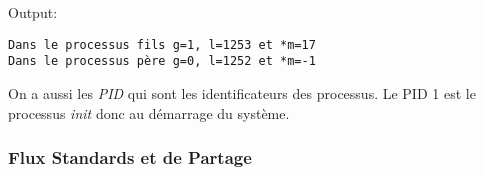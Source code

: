 \begin{Shaded}
\begin{Highlighting}[]
     \OperatorTok{(}\OperatorTok{=={-}}\OperatorTok{)} \OperatorTok{\{}
\OperatorTok{(}\OperatorTok{);} 
\OperatorTok{(}\OperatorTok{);}
    \OperatorTok{\}}
     \OperatorTok{(}\OperatorTok{==}\OperatorTok{)} \OperatorTok{\{}
\OperatorTok{++;}\OperatorTok{++;} \OperatorTok{*}\OperatorTok{=}\OperatorTok{;} 
\OperatorTok{(}\OperatorTok{,}\OperatorTok{,}\OperatorTok{,*}\OperatorTok{);} 
\OperatorTok{(}\OperatorTok{);} 
        \OperatorTok{(}\OperatorTok{);} 
    \OperatorTok{\}}  \OperatorTok{\{}
\OperatorTok{(}\OperatorTok{);} 
\OperatorTok{(}\OperatorTok{,}\OperatorTok{,}\OperatorTok{,*}\OperatorTok{);}
\OperatorTok{(}\OperatorTok{);} 
        \OperatorTok{(}\OperatorTok{);}
    \OperatorTok{\}}
\OperatorTok{\}}
\end{Highlighting}
\end{Shaded}

Output:

\begin{verbatim}
Dans le processus fils g=1, l=1253 et *m=17 
Dans le processus père g=0, l=1252 et *m=-1
\end{verbatim}

On a aussi les \emph{PID} qui sont les identificateurs des processus. Le
PID 1 est le processus \emph{init} donc au démarrage du système.

\subsubsection{Flux Standards et de
Partage}\label{flux-standards-et-de-partage}

